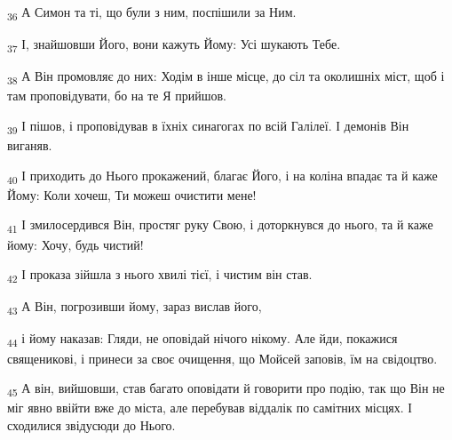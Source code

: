 \begin{tcolorbox}
\textsubscript{36} А Симон та ті, що були з ним, поспішили за Ним.
\end{tcolorbox}
\begin{tcolorbox}
\textsubscript{37} І, знайшовши Його, вони кажуть Йому: Усі шукають Тебе.
\end{tcolorbox}
\begin{tcolorbox}
\textsubscript{38} А Він промовляє до них: Ходім в інше місце, до сіл та околишніх міст, щоб і там проповідувати, бо на те Я прийшов.
\end{tcolorbox}
\begin{tcolorbox}
\textsubscript{39} І пішов, і проповідував в їхніх синагогах по всій Галілеї. І демонів Він виганяв.
\end{tcolorbox}
\begin{tcolorbox}
\textsubscript{40} І приходить до Нього прокажений, благає Його, і на коліна впадає та й каже Йому: Коли хочеш, Ти можеш очистити мене!
\end{tcolorbox}
\begin{tcolorbox}
\textsubscript{41} І змилосердився Він, простяг руку Свою, і доторкнувся до нього, та й каже йому: Хочу, будь чистий!
\end{tcolorbox}
\begin{tcolorbox}
\textsubscript{42} І проказа зійшла з нього хвилі тієї, і чистим він став.
\end{tcolorbox}
\begin{tcolorbox}
\textsubscript{43} А Він, погрозивши йому, зараз вислав його,
\end{tcolorbox}
\begin{tcolorbox}
\textsubscript{44} і йому наказав: Гляди, не оповідай нічого нікому. Але йди, покажися священикові, і принеси за своє очищення, що Мойсей заповів, їм на свідоцтво.
\end{tcolorbox}
\begin{tcolorbox}
\textsubscript{45} А він, вийшовши, став багато оповідати й говорити про подію, так що Він не міг явно ввійти вже до міста, але перебував віддалік по самітних місцях. І сходилися звідусюди до Нього.
\end{tcolorbox}
